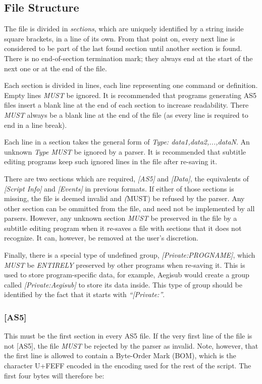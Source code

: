 \documentclass{spec}
\begin{document}
\subsection{File Structure}
The file is divided in \emph{sections}, which are uniquely identified by a string inside
square brackets, in a line of its own. From that point on, every next line is considered
to be part of the last found section until another section is found. There is no end-of-section
termination mark; they always end at the start of the next one or at the end of the file.

Each section is divided in lines, each line representing one command or definition. Empty
lines \emph{MUST} be ignored. It is recommended that programs generating AS5 files insert
a blank line at the end of each section to increase readability. There \emph{MUST} always
be a blank line at the end of the file (as every line is required to end in a line break).

Each line in a section takes the general form of \textit{Type: data1,data2,...,dataN}. An
unknown \textit{Type} \emph{MUST} be ignored by a parser. It is recommended that subtitle
editing programs keep such ignored lines in the file after re-saving it.

There are two sections which are required, \emph{[AS5]} and \emph{[Data]}, the equivalents of
\emph{[Script Info]} and \emph{[Events]} in previous formats. If either of those sections is
missing, the file is deemed invalid and \emph(MUST) be refused by the parser. Any other section
can be ommitted from the file, and need not be implemented by all parsers. However, any unknown
section \emph{MUST} be preserved in the file by a subtitle editing program when it re-saves a
file with sections that it does not recognize. It can, however, be removed at the user's discretion.

Finally, there is a special type of undefined group, \emph{[Private:PROGNAME]}, which 
\emph{MUST} be \emph{ENTIRELY} preserved by other programs when re-saving it. This is used to
store program-specific data, for example, Aegisub would create a group called
\emph{[Private:Aegisub]} to store its data inside. This type of group should be identified
by the fact that it starts with \emph{"`[Private:"'}.

\subsubsection{[AS5]}
This must be the first section in every AS5 file. If the very first line of the file is not
[AS5], the file \emph{MUST} be rejected by the parser as invalid. Note, however, that the first
line is allowed to contain a Byte-Order Mark (BOM), which is the character U+FEFF encoded in
the encoding used for the rest of the script\cite{Unicode BOM}. The first four bytes will therefore be:
\end{document}
